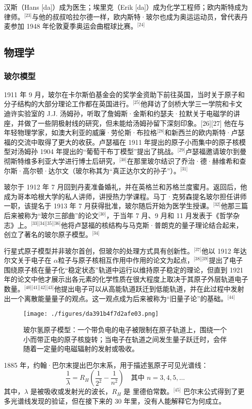 汉斯（Hans [da]）成为医生；埃里克（Erik [da]）成为化学工程师；欧内斯特成为律师。\(^\text{[23]}\)与他的叔叔哈拉尔德一样，欧内斯特·玻尔也成为奥运运动员，曾代表丹麦参加 1948 年伦敦夏季奥运会曲棍球比赛。\(^\text{[24]}\)
\subsection{物理学}
\subsubsection{玻尔模型}
1911 年 9 月，玻尔在卡尔斯伯基金会的奖学金资助下前往英国，当时关于原子和分子结构的大部分理论工作都在英国进行。\(^\text{[25]}\)他拜访了剑桥大学三一学院和卡文迪许实验室的 J.J. 汤姆孙，听取了詹姆斯·金斯和约瑟夫·拉默关于电磁学的讲座，并做了一些阴极射线的研究，但未能给汤姆孙留下深刻印象。[26][27] 他在与年轻物理学家，如澳大利亚的威廉·劳伦斯·布拉格\(^\text{[28]}\)和新西兰的欧内斯特·卢瑟福的交流中取得了更大的收获。卢瑟福在 1911 年提出的原子小而集中的原子核模型对汤姆孙 1904 年提出的“葡萄干布丁模型”提出了挑战。\(^\text{[29]}\)卢瑟福邀请玻尔到曼彻斯特维多利亚大学进行博士后研究，\(^\text{[30]}\)在那里玻尔结识了乔治·德·赫维希和查尔斯·高尔顿·达尔文（玻尔称其为“真正达尔文的孙子”）。\(^\text{[31]}\)

玻尔于 1912 年 7 月回到丹麦准备婚礼，并在英格兰和苏格兰度蜜月。返回后，他成为哥本哈根大学的私人讲师，讲授热力学课程。马丁·克努森提名玻尔担任讲师一职，该提名于 1913 年 7 月获得批准，玻尔随后开始为医学生授课。\(^\text{[32]}\)他那三篇后来被称为“玻尔三部曲”的论文\(^\text{[30]}\)，于当年 7 月、9 月和 11 月发表于《哲学杂志》上。\(^\text{[33][34][35][36]}\)他将卢瑟福的核结构与马克斯·普朗克的量子理论结合起来，创立了著名的玻尔原子模型。\(^\text{[34]}\)

行星式原子模型并非玻尔首创，但玻尔的处理方式具有创新性。\(^\text{[37]}\)他以 1912 年达尔文关于电子在 $\alpha$粒子与原子核相互作用中作用的论文为起点，\(^\text{[38][39]}\)提出了电子围绕原子核在量子化“稳定状态”轨道中运行以维持原子稳定的理论，但直到 1921 年的论文中他才展示出各元素的化学性质在很大程度上取决于其原子外层轨道电子数量。\(^\text{[40][41][42][43]}\)他提出电子可以从高能轨道跃迁到低能轨道，并在此过程中发射出一个离散能量量子的观点。这一观点成为后来被称为“旧量子论”的基础。\(^\text{[44]}\)
\begin{figure}[ht]
\centering
\texttt{[image: ./figures/da391b4f7d2afe03.png]}
\caption{玻尔氢原子模型：一个带负电的电子被限制在原子轨道上，围绕一个小而带正电的原子核旋转；当电子在轨道之间发生量子跃迁时，会伴随着一定量的电磁辐射的发射或吸收。} \label{fig_NRSbr_4}
\end{figure}
1885 年，约翰·巴尔末提出巴尔末系，用于描述氢原子可见光谱线：
$$
\frac{1}{\lambda} = R_H \left( \frac{1}{2^2} - \frac{1}{n^2} \right) \quad \text{其中 } n = 3,4,5,\ldots~
$$
其中，$\lambda$ 是被吸收或发射光的波长，$R_H$ 是 里德伯常数。\(^\text{[45]}\)
巴尔末公式得到了更多光谱线发现的验证，但在接下来的 30 年里，没有人能解释它为何成立。

